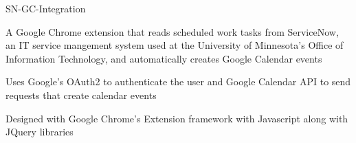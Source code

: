 \documentclass[]{awesome-cv}
\begin{document}
\begin{cventries}
	\cventry
	{}
	{SN-GC-Integration}
	{}
	{}
	{\begin{cvitems}
	\vspace{-4mm}
		\item {A Google Chrome extension that reads scheduled work tasks from ServiceNow, an IT service mangement system used at the University of Minnesota's Office of Information Technology, and automatically creates Google Calendar events}
		\item {Uses Google's OAuth2 to authenticate the user and Google Calendar API to send requests that create calendar events}
		\item {Designed with Google Chrome's Extension framework with Javascript along with JQuery libraries}
		\end{cvitems}}
\end{cventries}

\iffalse
\cvsection{Activities}
\begin{cventries}
	\cventry
	{A free, volunteer-led, community-based programming club where I help teach youth between ages seven and seventeen to code, build a website, create an app or game, and explore technology in an informal, creative, and social environment.}
	{Mentor at CoderDojo}
	{October 2017 - Present}
	{}
	{}
	\vspace{-5mm}
\end{cventries}
\cvsection{Awards and Accomplishments}
\begin{cvhonors}
	\cvhonor
	{Dean\textquotesingle{}s List}
	{}
	{University of MN}
	{2018-2019}
	\cvhonor
	{Presidential Scholarship}
	{}
	{University of MN}
	{2017}
	\cvhonor
	{Best of the Class Award}
	{}
	{KEYC TV Network}
	{2017}
	\cvhonor
	{All City Soccer Team}
	{}
	{MNYSA}
	{2017}
\end{cvhonors}
\fi
\end{document}
